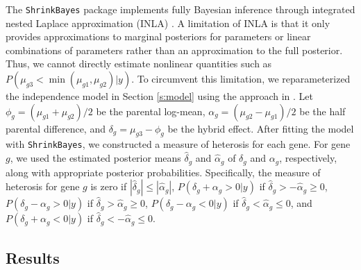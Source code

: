 \documentclass[useAMS,usenatbib,referee]{biom}
\begin{document}
The {\tt ShrinkBayes} package implements fully Bayesian inference through integrated nested Laplace approximation (INLA) \citep{rue2009approximate,van2014shrinkbayes}. A limitation of INLA is that it only provides approximations to marginal posteriors for parameters or linear combinations of parameters rather than an approximation to the full posterior. Thus, we cannot directly estimate nonlinear quantities such as $P(\mu_{g3} < \min(\mu_{g1},\mu_{g2})|y)$. To circumvent this limitation, we reparameterized the independence model in Section \ref{s:model} using the approach in \cite{ji2014estimation}. 
Let $\phi_g = (\mu_{g1}+\mu_{g2})/2$ be the parental log-mean, $\alpha_g = (\mu_{g2}-\mu_{g1})/2$ be the half parental difference, and $\delta_g = \mu_{g3} - \phi_g$ be the hybrid effect. After fitting the model with {\tt ShrinkBayes}, we constructed a measure of heterosis for each gene. For gene $g$, we used the estimated posterior means $\hat{\delta}_g$ and $\hat{\alpha}_g$ of $\delta_g$ and $\alpha_g$, respectively, along with appropriate posterior probabilities. Specifically, the measure of heterosis for gene $g$ is zero if $|\hat{\delta}_g| \le |\hat{\alpha}_g|$, $P(\delta_g + \alpha_g > 0 |y)$ if $\hat{\delta}_g > -\hat{\alpha}_g \ge 0$, $P(\delta_g - \alpha_g > 0 |y)$ if $\hat{\delta}_g > \hat{\alpha}_g \ge 0$, $P(\delta_g - \alpha_g < 0 |y)$ if $\hat{\delta}_g < \hat{\alpha}_g \le 0$, and $P(\delta_g + \alpha_g < 0 |y)$ if $\hat{\delta}_g < -\hat{\alpha}_g \le 0$.  

\subsection{Results}
\end{document}
